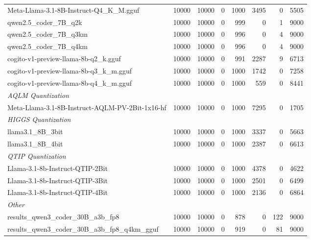 \begin{table}[htbp]
{\begin{tabular}{lrrrrrrr}
    Meta-Llama-3.1-8B-Instruct-Q4\_K\_M.gguf & 10000 & 10000 & 0 & 1000 & 3495 & 0 & 5505 \\
    qwen2.5\_coder\_7B\_q2k & 10000 & 10000 & 0 & 999 & 0 & 1 & 9000 \\
    qwen2.5\_coder\_7B\_q3km & 10000 & 10000 & 0 & 996 & 0 & 4 & 9000 \\
    qwen2.5\_coder\_7B\_q4km & 10000 & 10000 & 0 & 996 & 0 & 4 & 9000 \\
    cogito-v1-preview-llama-8b-q2\_k.gguf & 10000 & 10000 & 0 & 991 & 2287 & 9 & 6713 \\
    cogito-v1-preview-llama-8b-q3\_k\_m.gguf & 10000 & 10000 & 0 & 1000 & 1742 & 0 & 7258 \\
    cogito-v1-preview-llama-8b-q4\_k\_m.gguf & 10000 & 10000 & 0 & 1000 & 559 & 0 & 8441 \\
    \midrule
    \multicolumn{8}{l}{\textit{AQLM Quantization}} \\
    \midrule
    Meta-Llama-3.1-8B-Instruct-AQLM-PV-2Bit-1x16-hf & 10000 & 10000 & 0 & 1000 & 7295 & 0 & 1705 \\
    \midrule
    \multicolumn{8}{l}{\textit{HIGGS Quantization}} \\
    \midrule
    llama3.1\_8B\_3bit & 10000 & 10000 & 0 & 1000 & 3337 & 0 & 5663 \\
    llama3.1\_8B\_4bit & 10000 & 10000 & 0 & 1000 & 2387 & 0 & 6613 \\
    \midrule
    \multicolumn{8}{l}{\textit{QTIP Quantization}} \\
    \midrule
    Llama-3.1-8b-Instruct-QTIP-2Bit & 10000 & 10000 & 0 & 1000 & 4378 & 0 & 4622 \\
    Llama-3.1-8b-Instruct-QTIP-3Bit & 10000 & 10000 & 0 & 1000 & 2501 & 0 & 6499 \\
    Llama-3.1-8b-Instruct-QTIP-4Bit & 10000 & 10000 & 0 & 1000 & 2136 & 0 & 6864 \\
    \midrule
    \multicolumn{8}{l}{\textit{Other}} \\
    \midrule
    results\_qwen3\_coder\_30B\_a3b\_fp8 & 10000 & 10000 & 0 & 878 & 0 & 122 & 9000 \\
    results\_qwen3\_coder\_30B\_a3b\_fp8\_q4km\_gguf & 10000 & 10000 & 0 & 919 & 0 & 81 & 9000 \\
    \bottomrule
  \end{tabular}
  }
\end{table}


